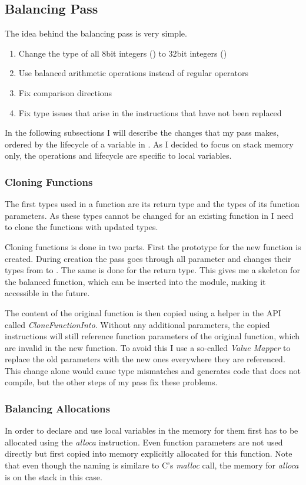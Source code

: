 \subsection{Balancing Pass}
\label{pass}
The idea behind the balancing pass is very simple.
\begin{enumerate}
\item Change the type of all 8bit integers () to 32bit integers ()
\item Use balanced arithmetic operations instead of regular operators
\item Fix comparison directions
\item Fix type issues that arise in the instructions that have not been replaced
\end{enumerate}

In the following subsections I will describe the changes that my pass makes, ordered by the lifecycle of a variable in \ir{}.
As I decided to focus on stack memory only, the operations and lifecycle are specific to local variables.

\subsubsection{Cloning Functions}
The first types used in a function are its return type and the types of its function parameters.
As these types cannot be changed for an existing function in \llvm{} I need to clone the functions with updated types.

Cloning functions is done in two parts.
First the prototype for the new function is created.
During creation the pass goes through all parameter and changes their types from  to .
The same is done for the return type.
This gives me a skeleton for the balanced function, which can be inserted into the module, making it accessible in the future.

The content of the original function is then copied using a helper in the \llvm{} API called \emph{CloneFunctionInto}.
Without any additional parameters, the copied instructions will still reference function parameters of the original function, which are invalid in the new function.
To avoid this I use a so-called \emph{Value Mapper} to replace the old parameters with the new ones everywhere they are referenced.
This change alone would cause type mismatches and generates code that does not compile, but the other steps of my pass fix these problems.

\subsubsection{Balancing Allocations}
In order to declare and use local variables in \ir{} the memory for them first has to be allocated using the \emph{alloca} instruction.
Even function parameters are not used directly but first copied into memory explicitly allocated for this function.
Note that even though the naming is similare to C's \emph{malloc} call, the memory for \emph{alloca} is on the stack in this case.

